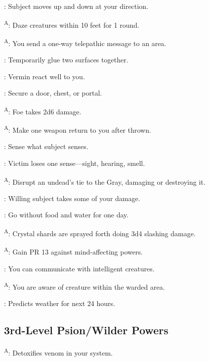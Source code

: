 : Subject moves up and down at your direction.

\textsuperscript{A}: Daze creatures within 10 feet for 1 round.

\textsuperscript{A}: You send a one-way telepathic message to an area.

: Temporarily glue two surfaces together.

: Vermin react well to you.

: Secure a door, chest, or portal.

\textsuperscript{A}: Foe takes 2d6 damage.

\textsuperscript{A}: Make one weapon return to you after thrown.

: Sense what subject senses.

: Victim loses one sense---sight, hearing, smell.

\textsuperscript{A}: Disrupt an undead's tie to the Gray, damaging or destroying it.

: Willing subject takes some of your damage.

: Go without food and water for one day.

\textsuperscript{A}: Crystal shards are sprayed forth doing 3d4 slashing damage.

\textsuperscript{A}: Gain PR 13 against mind-affecting powers.

: You can communicate with intelligent creatures.

\textsuperscript{A}: You are aware of creature within the warded area.

: Predicts weather for next 24 hours.




\subsection{3rd-Level Psion/Wilder Powers}

\textsuperscript{A}: Detoxifies venom in your system.


